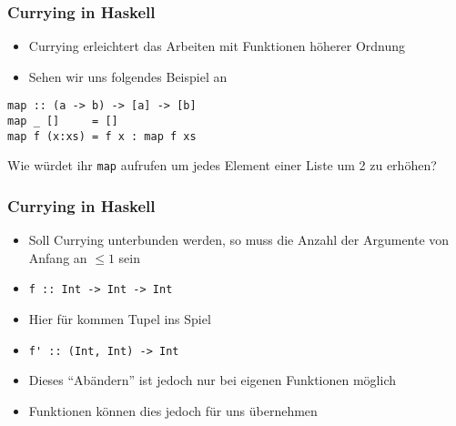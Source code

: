 \begin{frame}[fragile]
\frametitle{Currying in Haskell}
\begin{block}{\vspace*{-3ex}}
\begin{itemize}
  \item Currying erleichtert das Arbeiten mit Funktionen höherer Ordnung
  \item Sehen wir uns folgendes Beispiel an
\end{itemize}
\end{block}
\begin{lstlisting}
map :: (a -> b) -> [a] -> [b]
map _ []     = []
map f (x:xs) = f x : map f xs
\end{lstlisting}
\begin{block}{Wie würdet ihr \lstinline|map| aufrufen um jedes Element einer Liste um 2 zu erhöhen?}
\end{block}
\end{frame}

\begin{frame}
\frametitle{Currying in Haskell}
\begin{block}{\vspace*{-3ex}}
\begin{itemize}
  \item Soll Currying unterbunden werden, so muss die Anzahl der Argumente von Anfang an $\leq 1$ sein
  \item <1-3> \lstinline|f :: Int -> Int -> Int|
  \item <1-3> Hier für kommen Tupel ins Spiel
  \item <2-3> \lstinline|f' :: (Int, Int) -> Int|
  \item <2-3> Dieses "`Abändern"' ist jedoch nur bei eigenen Funktionen möglich
  \item <3> Funktionen können dies jedoch für uns übernehmen
\end{itemize}
\end{block}
\end{frame}

